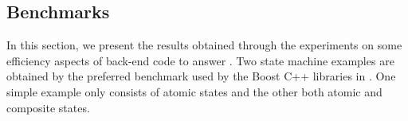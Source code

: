 \subsection{Benchmarks}
\label{subsec:exp3}
In this section, we present the results obtained through the experiments on some efficiency aspects of back-end code to answer . 
Two state machine examples are obtained by the preferred benchmark used by the Boost C++ libraries \cite{boost} in \cite{benchmark}. One simple example only consists of atomic states and the other both atomic and composite states. 

